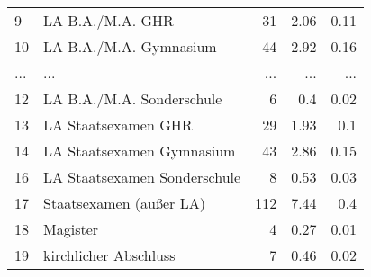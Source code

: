 \begin{longtable}{lXrrr}
        9 & \multicolumn{1}{X}{LA B.A./M.A. GHR} & %
          \num{31} &
          \num[round-mode=places,round-precision=2]{2,06} &
          \num[round-mode=places,round-precision=2]{0,11} \\
        10 & \multicolumn{1}{X}{LA B.A./M.A. Gymnasium} & %
          \num{44} &
          \num[round-mode=places,round-precision=2]{2,92} &
          \num[round-mode=places,round-precision=2]{0,16} \\
       ... & ... & ... & ... & ... \\
        12 & \multicolumn{1}{X}{LA B.A./M.A. Sonderschule} & %
          \num{6} &
          \num[round-mode=places,round-precision=2]{0,4} &
          \num[round-mode=places,round-precision=2]{0,02} \\

        13 & \multicolumn{1}{X}{LA Staatsexamen GHR} & %
          \num{29} &
          \num[round-mode=places,round-precision=2]{1,93} &
          \num[round-mode=places,round-precision=2]{0,1} \\

        14 & \multicolumn{1}{X}{LA Staatsexamen Gymnasium} & %
          \num{43} &
          \num[round-mode=places,round-precision=2]{2,86} &
          \num[round-mode=places,round-precision=2]{0,15} \\

        16 & \multicolumn{1}{X}{LA Staatsexamen Sonderschule} & %
          \num{8} &
          \num[round-mode=places,round-precision=2]{0,53} &
          \num[round-mode=places,round-precision=2]{0,03} \\

        17 & \multicolumn{1}{X}{Staatsexamen (außer LA)} & %
          \num{112} &
          \num[round-mode=places,round-precision=2]{7,44} &
          \num[round-mode=places,round-precision=2]{0,4} \\

        18 & \multicolumn{1}{X}{Magister} & %
          \num{4} &
          \num[round-mode=places,round-precision=2]{0,27} &
          \num[round-mode=places,round-precision=2]{0,01} \\

        19 & \multicolumn{1}{X}{kirchlicher Abschluss} & %
          \num{7} &
          \num[round-mode=places,round-precision=2]{0,46} &
          \num[round-mode=places,round-precision=2]{0,02} \\


\end{longtable}
